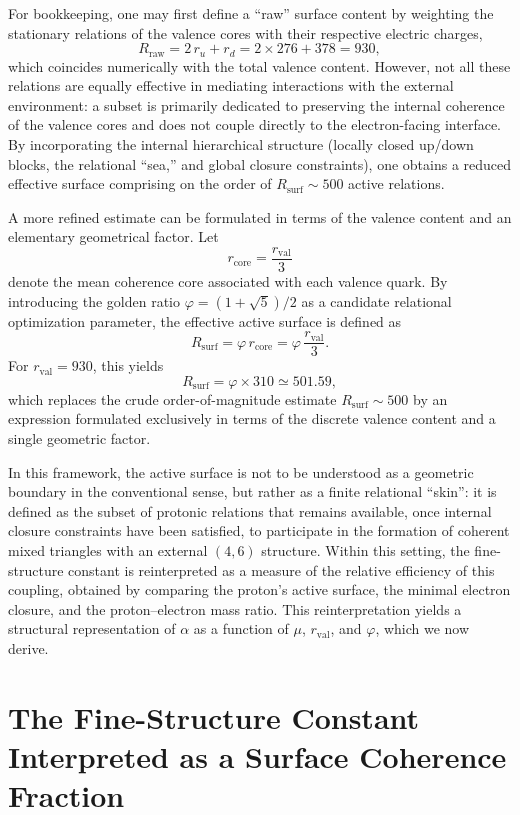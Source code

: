 \documentclass[12pt,a4paper]{article}
\begin{document}
For bookkeeping, one may first define a “raw” surface content by weighting the stationary relations of the valence cores with their respective electric charges,
\[
  R_{\text{raw}}
  =
  2\,r_u + r_d
  =
  2\times 276 + 378
  =
  930,
\]
which coincides numerically with the total valence content.
However, not all these relations are equally effective in mediating interactions with the external environment: a subset is primarily dedicated to preserving the internal coherence of the valence cores and does not couple directly to the electron-facing interface.
By incorporating the internal hierarchical structure (locally closed up/down blocks, the relational “sea,” and global closure constraints), one obtains a reduced effective surface comprising on the order of \(R_{\text{surf}} \sim 500\) active relations.\cite{Laubscher2026LDP_French}

A more refined estimate can be formulated in terms of the valence content and an elementary geometrical factor.
Let
\[
  r_{\text{core}} = \frac{r_{\text{val}}}{3}
\]
denote the mean coherence core associated with each valence quark.
By introducing the golden ratio \(\varphi = (1+\sqrt{5})/2\) as a candidate relational optimization parameter, the effective active surface is defined as
\[
  R_{\text{surf}} = \varphi\,r_{\text{core}}
  = \varphi\,\frac{r_{\text{val}}}{3}.
\]
For \(r_{\text{val}}=930\), this yields
\[
  R_{\text{surf}} = \varphi\times 310 \simeq 501.59,
\]
which replaces the crude order-of-magnitude estimate \(R_{\text{surf}}\sim 500\) by an expression formulated exclusively in terms of the discrete valence content and a single geometric factor.\cite{Laubscher2026LDP_French,Laubscher2026PDL_English}

In this framework, the active surface is not to be understood as a geometric boundary in the conventional sense, but rather as a finite relational “skin”: it is defined as the subset of protonic relations that remains available, once internal closure constraints have been satisfied, to participate in the formation of coherent mixed triangles with an external \((4,6)\) structure.
Within this setting, the fine-structure constant is reinterpreted as a measure of the relative efficiency of this coupling, obtained by comparing the proton’s active surface, the minimal electron closure, and the proton–electron mass ratio.
This reinterpretation yields a structural representation of \(\alpha\) as a function of \(\mu\), \(r_{\text{val}}\), and \(\varphi\), which we now derive.

\section{The Fine-Structure Constant Interpreted as a Surface Coherence Fraction}
\end{document}
